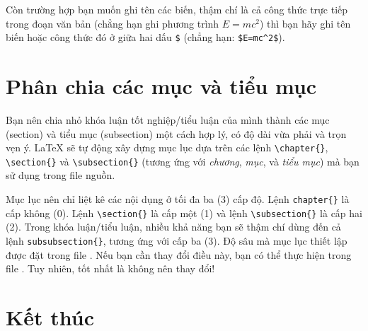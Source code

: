 Còn trường hợp bạn muốn ghi tên các biến, thậm chí là cả công thức trực tiếp trong đoạn văn bản (chẳng hạn ghi phương trình $E=mc^2$) thì bạn hãy ghi tên biến hoặc công thức đó ở giữa hai dấu \verb|$| (chẳng hạn: \verb|$E=mc^2$|).



\section{Phân chia các mục và tiểu mục}

Bạn nên chia nhỏ khóa luận tốt nghiệp/tiểu luận của mình thành các mục (section) và tiểu mục (subsection) một cách hợp lý, có độ dài vừa phải và trọn vẹn ý. \LaTeX{} sẽ tự động xây dựng mục lục dựa trên các lệnh \verb|\chapter{}|, \verb|\section{}| và \verb|\subsection{}| (tương ứng với \textit{chương}, \textit{mục}, và \textit{tiểu mục}) mà bạn sử dụng trong file nguồn.

Mục lục nên chỉ liệt kê các nội dụng ở tối đa ba (3) cấp độ. Lệnh \verb|chapter{}| là cấp không (0). Lệnh \verb|\section{}| là cấp một (1) và lệnh \verb|\subsection{}| là cấp hai (2). Trong khóa luận/tiểu luận, nhiều khả năng bạn sẽ thậm chí dùng đến cả lệnh \verb|subsubsection{}|, tương ứng với cấp ba (3). Độ sâu mà mục lục thiết lập được đặt trong file . Nếu bạn cần thay đổi điều này, bạn có thể thực hiện trong file . Tuy nhiên, tốt nhất là không nên thay đổi!



\section{Kết thúc}

